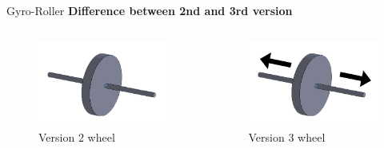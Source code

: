 \documentclass[10pt]{beamer}
\begin{document}
\begin{frame}{Gyro-Roller}
	\textbf{Difference between 2nd and 3rd version}
	\break
	\begin{columns}[c]
		\begin{figure}
			\includegraphics[width=\textwidth]{wheel_ver2}
			\caption{Version 2 wheel}
		\end{figure}
		\begin{figure}
			\includegraphics[width=\textwidth]{wheel_ver3}
			\caption{Version 3 wheel}
		\end{figure}
	\end{columns}
\end{frame}
\end{document}
